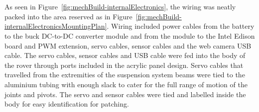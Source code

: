       \\\\
        As seen in Figure~\ref{fig:mechBuild-internalElectronics}, the wiring was neatly packed into the area reserved as in Figure~\ref{fig:mechBuild-internalElectronicsMountingPlan}. Wiring included power cables from the battery to the buck DC-to-DC converter module and from the module to the Intel Edison board and PWM extension, servo cables, sensor cables and the web camera USB cable. The servo cables, sensor cables and USB cable were fed into the body of the rover through ports included in the acrylic panel design. Servo cables that travelled from the extremities of the suspension system beams were tied to the aluminium tubing with enough slack to cater for the full range of motion of the joints and pivots. The servo and sensor cables were tied and labelled inside the body for easy identification for patching.